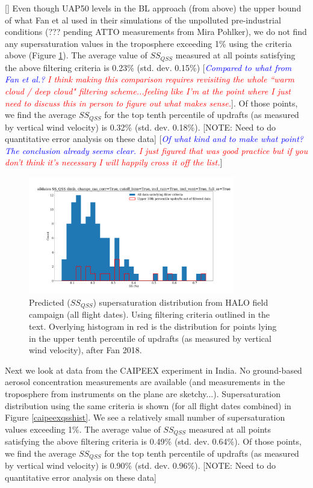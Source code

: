 \documentclass{article}
\newcommand{\drcomm}[1]{\textcolor{blue}{\textit{#1}}}
\newcommand{\klcomm}[1]{\textcolor{red}{\textit{#1}}}
\begin{document}
[] Even though UAP50 levels in the BL approach (from above) the upper bound of what Fan et al used in their simulations of the unpolluted pre-industrial conditions (??? pending ATTO measurements from Mira Pohlker), we do not find any supersaturation values in the troposphere exceeding 1\% using the criteria above (Figure \ref{haloqsshist}). The average value of $SS_{QSS}$ measured at all points satisfying the above filtering criteria is 0.23\% (std. dev. 0.15\%) [\drcomm{Compared to what from Fan et al.?} \klcomm{I think making this comparison requires revisiting the whole ``warm cloud / deep cloud" filtering scheme...feeling like I'm at the point where I just need to discuss this in person to figure out what makes sense.}]. Of those points, we find the average $SS_{QSS}$ for the top tenth percentile of updrafts (as measured by vertical wind velocity) is 0.32\% (std. dev. 0.18\%). [NOTE: Need to do quantitative error analysis on these data] [\drcomm{Of what kind and to make what point? The conclusion already seems clear.} \klcomm{I just figured that was good practice but if you don't think it's necessary I will happily cross it off the list.}]

\clearpage
\newpage

\begin{figure}[ht]
    \centering
    \includegraphics[width=9cm]{revhalo/v24_with_up10perc_ss_qss_hist_cas_alldates_figure.png}
    \caption{Predicted ($SS_{QSS}$) supersaturation distribution from HALO field campaign (all flight dates). Using filtering criteria outlined in the text. Overlying histogram in red is the distribution for points lying in the upper tenth percentile of updrafts (as measured by vertical wind velocity), after Fan 2018.}
    \label{haloqsshist}
\end{figure}

Next we look at data from the CAIPEEX experiment in India. No ground-based aerosol concentration measurements are available (and measurements in the troposphere from instruments on the plane are sketchy...). Supersaturation distribution using the same criteria is shown (for all flight dates combined) in Figure \ref{caipeexqsshist}. We see a relatively small number of supersaturation values exceeding 1\%. The average value of $SS_{QSS}$ measured at all points satisfying the above filtering criteria is 0.49\% (std. dev. 0.64\%). Of those points, we find the average $SS_{QSS}$ for the top tenth percentile of updrafts (as measured by vertical wind velocity) is 0.90\% (std. dev. 0.96\%). [NOTE: Need to do quantitative error analysis on these data]
\end{document}
